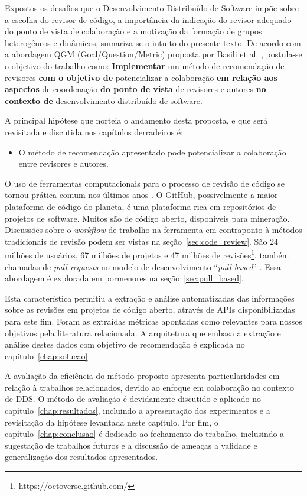 \documentclass[preprint,12pt]{elsarticle}
\begin{document}
  Expostos os desafios que o Desenvolvimento Distribuído de Software impõe sobre a escolha do revisor de código, a importância da indicação do revisor adequado do ponto de vista de colaboração e a motivação da formação de grupos heterogêneos e dinâmicos, sumariza-se o intuito do presente texto. De acordo com a abordagem QGM (Goal/Question/Metric) proposta por Basili et al. \cite{Basili1984}, postula-se o objetivo do trabalho como:  \textbf{Implementar} um método de recomendação de revisores \textbf{com o objetivo de} potencializar a colaboração \textbf{em relação aos aspectos} de coordenação \textbf{do ponto de vista} de revisores e autores \textbf{no contexto de} desenvolvimento distribuído de software.

  A principal hipótese que norteia o andamento desta proposta, e que será revisitada e discutida nos capítulos derradeiros é:

  \begin{itemize}
    \item O método de recomendação apresentado pode potencializar a colaboração entre revisores e autores.
  \end{itemize}

  O uso de ferramentas computacionais para o processo de revisão de código se tornou prática comum nos últimos anos \cite{Bacchelli2013}. O GitHub, possivelmente a maior plataforma de código do planeta, é uma plataforma rica em repositórios de projetos de software. Muitos são de código aberto, disponíveis para mineração. Discussões sobre o \textit{workflow} de trabalho na ferramenta em contraponto à métodos tradicionais de revisão podem ser vistas na seção~\ref{sec:code_review}. São 24 milhões de usuários, 67 milhões de projetos e 47 milhões de revisões\footnote{https://octoverse.github.com/}, também chamadas de \textit{pull requests} no modelo de desenvolvimento ``\textit{pull based}'' \cite{gousios2014}. Essa abordagem é explorada em pormenores na seção~\ref{sec:pull_based}.

  Esta característica permitiu a extração e análise automatizadas das informações sobre as revisões em projetos de código aberto, através de APIs disponibilizadas para este fim. Foram as extraídas métricas apontadas como relevantes para nossos objetivos pela literatura relacionada. A arquitetura que embasa a extração e análise destes dados com objetivo de recomendação é explicada no capítulo~\ref{chap:solucao}.

  A avaliação da eficiência do método proposto apresenta particularidades em relação à trabalhos relacionados, devido ao enfoque em colaboração no contexto de DDS. O método de avaliação é devidamente discutido e aplicado no capítulo~\ref{chap:resultados}, incluindo a apresentação dos experimentos e a revisitação da hipótese levantada neste capítulo. Por fim, o capítulo~\ref{chap:conclusao} é dedicado ao fechamento do trabalho, inclusindo a sugestação de trabalhos futuros e a discussão de ameaças a validade e generalização dos resultados apresentados.
\end{document}
